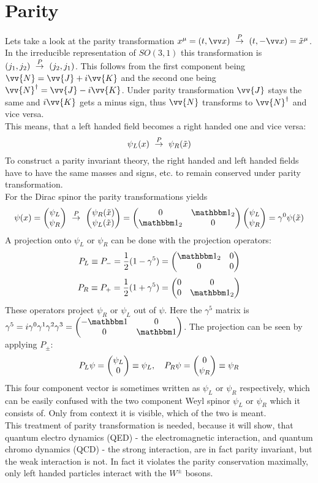 \section{Parity}
Lets take a look at the parity transformation $x^\mu = (t, \vx) ~\overset{P}{\df}~ (t, - \vx) = \tilde{x}^\mu$.\\
In the irreducible representation of $SO(3,1)$ this transformation is $(j_1, j_2)~\overset{P}{\rightarrow}~ (j_2, j_1)$. This follows from the first component being $\vv{N} = \vv{J} + i \vv{K}$ and the second one being $\vv{N}^\dagger = \vv{J} - i \vv{K}$. Under parity transformation $\vv{J}$ stays the same and $i\vv{K}$ gets a minus sign, thus $\vv{N}$ transforms to $\vv{N}^\dagger$ and vice versa.\\
This means, that a left handed field becomes a right handed one and vice versa:
\[\psi_L(x) ~\overset{P}{\rightarrow}~ \psi_R(\tilde{x})\]
To construct a parity invariant theory, the right handed and left handed fields have to have the same masses and signs, etc. to remain conserved under parity transformation.\\
For the Dirac spinor the parity transformations yields
\[ \psi(x) = \vektorz{\psi_L}{\psi_R} ~\overset{P}{\df}~ \vektorz{\psi_R(\tilde{x})}{\psi_L(\tilde{x})} = \Matz{0}{\ehm_2}{\ehm_2}{0} \vektorz{\psi_L}{\psi_R} = \gamma^0 \psi(\tilde{x})\]
A projection onto $\psi_L$ or $\psi_R$ can be done with the projection operators:
\[ P_L \equiv P_- = \frac{1}{2} ( 1 - \gamma^5) = \Matz{\ehm_2}{0}{0}{0}\]
\[ P_R \equiv P_+ = \frac{1}{2} ( 1 + \gamma^5) = \Matz{0}{0}{0}{\ehm_2}\]
These operators project $\psi_R$ or $\psi_L$ out of $\psi$. Here the $\gamma^5$ matrix is $\gamma^5 = i \gamma^0 \gamma^1\gamma^2\gamma^3 = \Matz{-\ehm}{0}{0}{\ehm}$. The projection can be seen by applying $P_\pm$:
\[P_L\psi = \begin{pmatrix} \psi_L \\ 0 \end{pmatrix} \equiv \psi_L, ~~~ P_R \psi = \begin{pmatrix} 0 \\ \psi_R \end{pmatrix} \equiv \psi_R\]
This four component vector is sometimes written as $\psi_L$ or $\psi_R$ respectively, which can be easily confused with the two component Weyl spinor $\psi_L$ or $\psi_R$ which it consists of. Only from context it is visible, which of the two is meant.\\
This treatment of parity transformation is needed, because it will show, that quantum electro dynamics (QED) - the electromagnetic interaction, and quantum chromo dynamics (QCD) - the strong interaction, are in fact parity invariant, but the weak interaction is not. In fact it violates the parity conservation maximally, only left handed particles interact with the $W^\pm$ bosons.

